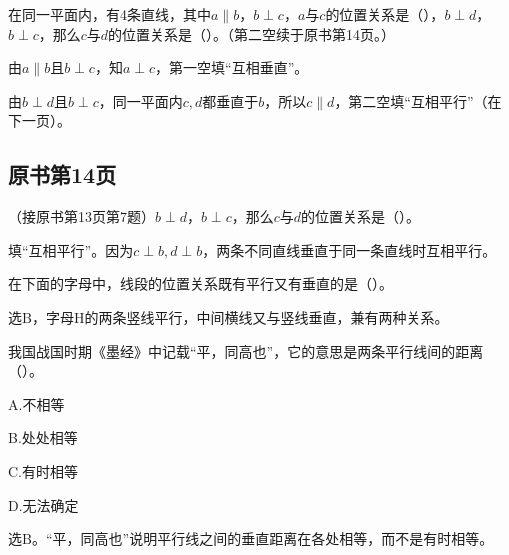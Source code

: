 在同一平面内，有4条直线，其中\(a\parallel b\)，\allowbreak{}\(b\perp c\)，\allowbreak{}\(a\)与\(c\)的位置关系是（\hspace{1.8em}），\allowbreak{}\(b\perp d\)，\allowbreak{}\(b\perp c\)，那么\(c\)与\(d\)的位置关系是（\hspace{1.8em}）。（第二空续于原书第14页。）\par
{}
\begin{BookAnswer}
由\(a\parallel b\)且\(b\perp c\)，知\(a\perp c\)，第一空填“互相垂直”。\par 由\(b\perp d\)且\(b\perp c\)，同一平面内\(c,d\)都垂直于\(b\)，所以\(c\parallel d\)，第二空填“互相平行”（在下一页）。
\end{BookAnswer}



\subsection*{原书第14页}

（接原书第13页第7题）\(b\perp d\)，\allowbreak{}\(b\perp c\)，那么\(c\)与\(d\)的位置关系是（\hspace{1.8em}）。\par
\begin{BookAnswer}
填“互相平行”。因为\(c\perp b,d\perp b\)，两条不同直线垂直于同一条直线时互相平行。
\end{BookAnswer}

在下面的字母中，线段的位置关系既有平行又有垂直的是（\hspace{1.8em}）。\par
{}
\begin{BookAnswer}
选\(\mathrm B\)，字母\(\mathrm H\)的两条竖线平行，中间横线又与竖线垂直，兼有两种关系。
\end{BookAnswer}

我国战国时期《墨经》中记载“平，同高也”，它的意思是两条平行线间的距离（\hspace{1.8em}）。\par
\noindent A.不相等\par
\noindent B.处处相等\par
\noindent C.有时相等\par
\noindent D.无法确定\par
\begin{BookAnswer}
选\(\mathrm B\)。“平，同高也”说明平行线之间的垂直距离在各处相等，而不是有时相等。
\end{BookAnswer}

